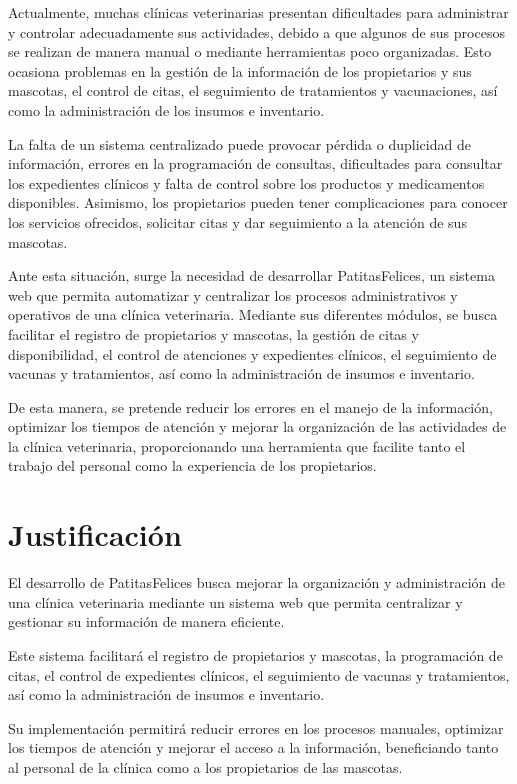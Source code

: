 Actualmente, muchas clínicas veterinarias presentan dificultades para administrar y controlar adecuadamente sus actividades, debido a que algunos de sus procesos se realizan de manera manual o mediante herramientas poco organizadas. Esto ocasiona problemas en la gestión de la información de los propietarios y sus mascotas, el control de citas, el seguimiento de tratamientos y vacunaciones, así como la administración de los insumos e inventario.

La falta de un sistema centralizado puede provocar pérdida o duplicidad de información, errores en la programación de consultas, dificultades para consultar los expedientes clínicos y falta de control sobre los productos y medicamentos disponibles. Asimismo, los propietarios pueden tener complicaciones para conocer los servicios ofrecidos, solicitar citas y dar seguimiento a la atención de sus mascotas.

Ante esta situación, surge la necesidad de desarrollar PatitasFelices, un sistema web que permita automatizar y centralizar los procesos administrativos y operativos de una clínica veterinaria. Mediante sus diferentes módulos, se busca facilitar el registro de propietarios y mascotas, la gestión de citas y disponibilidad, el control de atenciones y expedientes clínicos, el seguimiento de vacunas y tratamientos, así como la administración de insumos e inventario.

De esta manera, se pretende reducir los errores en el manejo de la información, optimizar los tiempos de atención y mejorar la organización de las actividades de la clínica veterinaria, proporcionando una herramienta que facilite tanto el trabajo del personal como la experiencia de los propietarios.

\section{Justificación}

El desarrollo de PatitasFelices busca mejorar la organización y administración de una clínica veterinaria mediante un sistema web que permita centralizar y gestionar su información de manera eficiente.

Este sistema facilitará el registro de propietarios y mascotas, la programación de citas, el control de expedientes clínicos, el seguimiento de vacunas y tratamientos, así como la administración de insumos e inventario.

Su implementación permitirá reducir errores en los procesos manuales, optimizar los tiempos de atención y mejorar el acceso a la información, beneficiando tanto al personal de la clínica como a los propietarios de las mascotas.
